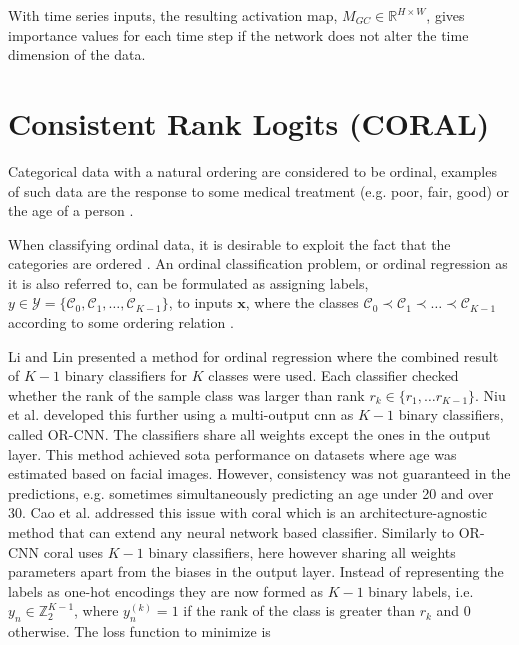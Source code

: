 With time series inputs, the resulting activation map, $M_{GC} \in \mathbb{R}^{H \times W}$, gives importance values for each time step if the network does not alter the time dimension of the data.%

\section{Consistent Rank Logits (CORAL)}
Categorical data with a natural ordering are considered to be ordinal, examples of such data are the response to some medical treatment (e.g. poor, fair, good) \cite{Agresti2007} or the age of a person \cite{Cao2019}.

When classifying ordinal data, it is desirable to exploit the fact that the categories are ordered \cite{Agresti2007}. An ordinal classification problem, or ordinal regression as it is also referred to, can be formulated as assigning labels, $y \in \mathcal{Y} = \{\mathcal{C}_0, \mathcal{C}_1, \hdots, \mathcal{C}_{K-1} \}$, to inputs $\pmb{x}$, where the classes $\mathcal{C}_0 \prec \mathcal{C}_1 \prec \hdots \prec \mathcal{C}_{K-1}$ according to some ordering relation \cite{Cao2019}.

Li and Lin \cite{Li2007} presented a method for ordinal regression where the combined result of $K-1$ binary classifiers for $K$ classes were used. Each classifier checked whether the rank of the sample class was larger than rank $r_k \in \{r_1, \hdots r_{K-1}\}$. Niu et al. \cite{Niu2016} developed this further using a multi-output \gls{cnn} as $K-1$ binary classifiers, called OR-CNN. The classifiers share all weights except the ones in the output layer. This method achieved \gls{sota} performance on datasets where age was estimated based on facial images. However, consistency was not guaranteed in the predictions, e.g. sometimes simultaneously predicting an age under 20 and over 30.
Cao et al. \cite{Cao2019} addressed this issue with \gls{coral} which is an architecture-agnostic method that can extend any neural network based classifier. Similarly to OR-CNN \gls{coral} uses $K-1$ binary classifiers, here however sharing all weights parameters apart from the biases in the output layer. Instead of representing the labels as one-hot encodings they are now formed as $K-1$ binary labels, i.e. $y_n \in \mathbb{Z}_2^{K-1}$, where $y_n^{(k)} = 1$ if the rank of the class is greater than $r_k$ and 0 otherwise. The loss function to minimize is

